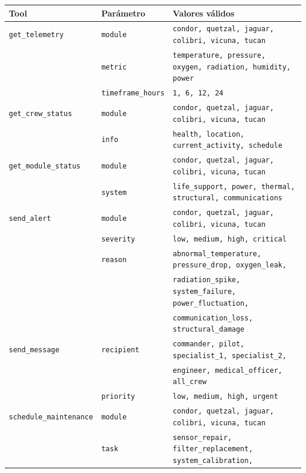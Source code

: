 \documentclass{article}
\begin{document}
\begin{table}[H]
\centering
\footnotesize
\begin{tabular}{|l|l|l|}
\hline
\textbf{Tool} & \textbf{Parámetro} & \textbf{Valores válidos} \\ \hline
{\texttt{get\_telemetry}}
    & \texttt{module}          & \texttt{condor, quetzal, jaguar, colibri, vicuna, tucan} \\
    & \texttt{metric}          & \texttt{temperature, pressure, oxygen, radiation, humidity, power} \\
    & \texttt{timeframe\_hours} & \texttt{1, 6, 12, 24} \\ \hline
{\texttt{get\_crew\_status}}
    & \texttt{module}          & \texttt{condor, quetzal, jaguar, colibri, vicuna, tucan} \\
    & \texttt{info}            & \texttt{health, location, current\_activity, schedule} \\ \hline
{\texttt{get\_module\_status}}
    & \texttt{module}          & \texttt{condor, quetzal, jaguar, colibri, vicuna, tucan} \\
    & \texttt{system}          & \texttt{life\_support, power, thermal, structural, communications} \\ \hline
{\texttt{send\_alert}}
    & \texttt{module}          & \texttt{condor, quetzal, jaguar, colibri, vicuna, tucan} \\
    & \texttt{severity}        & \texttt{low, medium, high, critical} \\
    & \texttt{reason}          & \texttt{abnormal\_temperature, pressure\_drop, oxygen\_leak,} \\
    &                          & \texttt{radiation\_spike, system\_failure, power\_fluctuation,} \\
    &                          & \texttt{communication\_loss, structural\_damage} \\ \hline
{\texttt{send\_message}}
    & \texttt{recipient}       & \texttt{commander, pilot, specialist\_1, specialist\_2,} \\
    &                          & \texttt{engineer, medical\_officer, all\_crew} \\
    & \texttt{priority}        & \texttt{low, medium, high, urgent} \\ \hline
{\texttt{schedule\_maintenance}}
    & \texttt{module}          & \texttt{condor, quetzal, jaguar, colibri, vicuna, tucan} \\
    & \texttt{task}            & \texttt{sensor\_repair, filter\_replacement, system\_calibration,} \\

\end{tabular}
\end{table}
\end{document}
